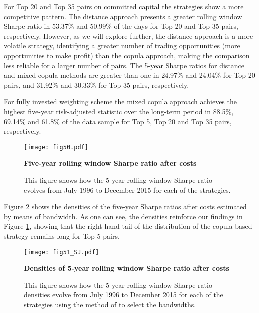 \documentclass[a4paper]{article}
\begin{document}
For Top 20 and Top 35 pairs on committed capital the strategies show a more competitive pattern. The distance approach presents a greater rolling window Sharpe ratio in 53.37\% and 50.99\% of the days for Top 20 and Top 35 pairs, respectively. However, as we will explore further, the distance approach is a more volatile strategy, identifying a greater number of trading opportunities (more opportunities to make profit) than the copula approach, making the comparison less reliable for a larger number of pairs. The 5-year Sharpe ratios for distance and mixed copula methods are greater than one in 24.97\% and 24.04\% for Top 20 pairs, and 31.92\% and 30.33\% for Top 35 pairs, respectively.

For fully invested weighting scheme the mixed copula approach achieves the highest five-year risk-adjusted statistic over the long-term period in 88.5\%, 69.14\% and 61.8\% of the data sample for Top 5, Top 20 and Top 35 pairs, respectively.


\begin{figure}[H]
\centering
\texttt{[image: fig50.pdf]}
\captionsetup{justification=raggedright,
	singlelinecheck=false
}
\caption{\textbf{Five-year rolling window Sharpe ratio after costs}}
\caption*{\scriptsize This figure shows how the 5-year rolling window Sharpe ratio evolves from July 1996 to December 2015 for each of the strategies.}
\label{fig:fig50}
\end{figure}

\vspace{0.6cm}

Figure \ref{fig:fig51} shows the densities of the five-year Sharpe ratios after costs estimated by means of \citet*{sj1991} bandwidth. As one can see, the densities reinforce our findings in Figure \ref{fig:fig50}, showing that the right-hand tail of the distribution of the copula-based strategy remains long for Top 5 pairs.


\begin{figure}[H]
	\centering
	\texttt{[image: fig51\_SJ.pdf]}
	\captionsetup{justification=raggedright,
		singlelinecheck=false
	}
	\caption{\textbf{Densities of 5-year rolling window Sharpe ratio after costs}}
	\caption*{\scriptsize This figure shows how the 5-year rolling window Sharpe ratio densities evolve from July 1996 to December 2015 for each of the strategies using the method of \citet*{sj1991} to select the bandwidths.}
	\label{fig:fig51}
\end{figure}
\end{document}
